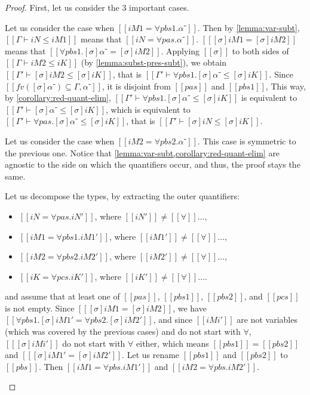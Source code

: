 \begin{proof}
  First, let us consider the 3 important cases.
  \begin{caseof}
    \item Let us consider the case when $[[iM1 = ∀pbs1.α⁻]]$. 
      Then by \cref{lemma:var-subt},
       $[[Γ ⊢ iN ≤ iM1]]$ means that $[[iN = ∀pas.α⁻]]$. 
      $[[ [σ]iM1 = [σ]iM2 ]]$ means that $[[ ∀pbs1.[σ]α⁻ = [σ]iM2 ]]$.
      Applying $[[σ]]$ to both sides of $[[Γ ⊢ iM2 ≤ iK]]$ (by \cref{lemma:subst-pres-subt}),
      we obtain $[[Γ' ⊢ [σ]iM2 ≤ [σ]iK]]$, that is $[[Γ' ⊢  ∀pbs1.[σ]α⁻ ≤ [σ]iK]]$.
      Since $[[ fv([σ]α⁻) ⊆ Γ,α⁻ ]]$, it is disjoint from $[[pas]]$ and $[[pbs1]]$,
      This way, by \cref{corollary:red-quant-elim}, 
      $[[Γ' ⊢  ∀pbs1.[σ]α⁻ ≤ [σ]iK]]$ is equivalent to 
      $[[Γ' ⊢  [σ]α⁻ ≤ [σ]iK]]$, which is equivalent to $[[Γ' ⊢  ∀pas.[σ]α⁻ ≤ [σ]iK]]$,
      that is $[[Γ' ⊢  [σ]iN ≤ [σ]iK]]$.
    \item Let us consider the case when $[[iM2 = ∀pbs2.α⁻]]$.
      This case is symmetric to the previous one. Notice that 
      \cref{lemma:var-subt,corollary:red-quant-elim} are agnostic to the 
      side on which the quantifiers occur, and thus, 
      the proof stays the same. 
    \item Let us decompose the types, by extracting the outer quantifiers:
      \begin{itemize}
        \item $[[iN = ∀pas.iN']]$, where $[[iN']] \neq [[∀]]\dots$,
        \item $[[iM1 = ∀pbs1.iM1']]$, where $[[iM1']] \neq [[∀]]\dots$,
        \item $[[iM2 = ∀pbs2.iM2']]$, where $[[iM2']] \neq [[∀]]\dots$,
        \item $[[iK = ∀pcs.iK']]$, where $[[iK']] \neq [[∀]]\dots$.
      \end{itemize}
      and assume that at least one of $[[pas]]$, $[[pbs1]]$, $[[pbs2]]$, and $[[pcs]]$ is not empty.
      Since $[[ [σ]iM1 = [σ]iM2 ]]$, we have $[[ ∀pbs1.[σ]iM1' = ∀pbs2.[σ]iM2' ]]$,
      and since $[[iMi']]$ are not variables 
      (which was covered by the previous cases) and do not start with $\forall$,
      $[[ [σ]iMi' ]]$ do not start with $\forall$ either,
      which means $[[pbs1]] = [[pbs2]]$ and $[[ [σ]iM1' = [σ]iM2' ]]$.
      Let us rename $[[pbs1]]$ and $[[pbs2]]$ to $[[pbs]]$.
      Then $[[iM1 = ∀pbs.iM1']]$ and $[[iM2 = ∀pbs.iM2']]$.


\end{caseof}
\end{proof}

